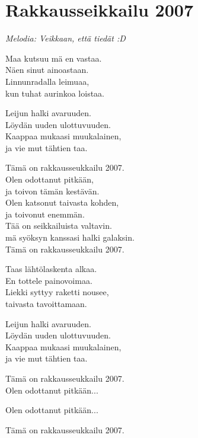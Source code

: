 \section{Rakkausseikkailu 2007}
\textit{Melodia: Veikkaan, että tiedät :D}

Maa kutsuu mä en vastaa.\\
Näen sinut ainoastaan.\\
Linnunradalla leimuaa,\\
kun tuhat aurinkoa loistaa.

Leijun halki avaruuden.\\
Löydän uuden ulottuvuuden.\\
Kaappaa mukaasi muukalainen,\\
ja vie mut tähtien taa.

Tämä on rakkausseukkailu 2007.\\
Olen odottanut pitkään,\\
ja toivon tämän kestävän.\\
Olen katsonut taivasta kohden,\\
ja toivonut enemmän.\\
Tää on seikkailuista valtavin.\\
mä syöksyn kanssasi halki galaksin.\\
Tämä on rakkausseukkailu 2007.

Taas lähtölaskenta alkaa.\\
En tottele painovoimaa.\\
Liekki syttyy raketti nousee,\\
taivasta tavoittamaan.

Leijun halki avaruuden.\\
Löydän uuden ulottuvuuden.\\
Kaappaa mukaasi muukalainen,\\
ja vie mut tähtien taa.

Tämä on rakkausseukkailu 2007.\\
Olen odottanut pitkään...

Olen odottanut pitkään...

Tämä on rakkausseukkailu 2007.